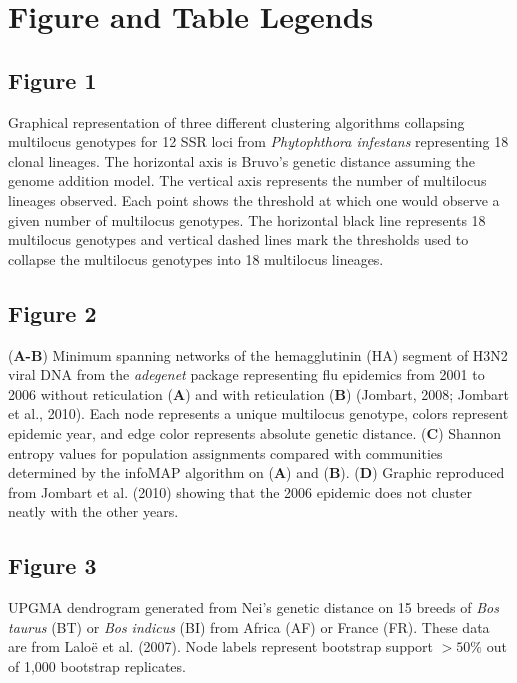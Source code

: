 \documentclass{frontiersSCNS} %
\begin{document}
\section*{Figure and Table Legends}\label{figure-and-table-legends}

\subsection*{Figure 1}\label{figure-1-1}

Graphical representation of three different clustering algorithms
collapsing multilocus genotypes for 12 SSR loci from \emph{Phytophthora
infestans} representing 18 clonal lineages. The horizontal axis is
Bruvo's genetic distance assuming the genome addition model. The
vertical axis represents the number of multilocus lineages observed.
Each point shows the threshold at which one would observe a given number
of multilocus genotypes. The horizontal black line represents 18
multilocus genotypes and vertical dashed lines mark the thresholds used
to collapse the multilocus genotypes into 18 multilocus lineages.

\subsection*{Figure 2}\label{figure-2-1}

(\textbf{A-B}) Minimum spanning networks of the hemagglutinin (HA)
segment of H3N2 viral DNA from the \emph{adegenet} package representing
flu epidemics from 2001 to 2006 without reticulation (\textbf{A}) and
with reticulation (\textbf{B}) (Jombart, 2008; Jombart et al., 2010).
Each node represents a unique multilocus genotype, colors represent
epidemic year, and edge color represents absolute genetic distance.
(\textbf{C}) Shannon entropy values for population assignments compared
with communities determined by the infoMAP algorithm on (\textbf{A}) and
(\textbf{B}). (\textbf{D}) Graphic reproduced from Jombart et al. (2010)
showing that the 2006 epidemic does not cluster neatly with the other
years.

\subsection*{Figure 3}\label{figure-3-1}

UPGMA dendrogram generated from Nei's genetic distance on 15 breeds of
\emph{Bos taurus} (BT) or \emph{Bos indicus} (BI) from Africa (AF) or
France (FR). These data are from Lalo{ë} et al. (2007). Node labels
represent bootstrap support \(>50\%\) out of 1,000 bootstrap replicates.
\end{document}
